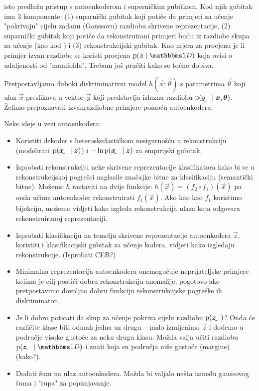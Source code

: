 \documentclass[oneside]{book}
\begin{document}
\citet{Pidhorskyi:2018:GPNDAA} isto predlažu pristup s autoenkoderom i superničkim gubitkom. Kod njih gubitak ima $3$ komponente: (1) suparnički gubitak koji potiče da primjeri za učenje "pokrivaju" cijelu zadanu (Gaussovu) razdiobu skrivene reprezentacije, (2) suparnički gubitak koji potiče da rekonstruirani primjeri budu iz razdiobe skupa za učenje (kao kod \citet{Sabokrou:2018:ALOCCND}) i (3) rekonstrukcijski gubitak. Kao mjera za procjenu je li primjer izvan razdiobe se koristi procjena $\p(\vec z\mid \set D)$ koja ovisi o udaljenosti od "manifolda". Trebam još pručiti kako se točno dobiva.

Pretpostavljamo duboki diskriminativni model $h(\vec x;\vec\theta)$ s parametrima $\vec\theta$ koji ulaz $\vec x$ preslikava u vektor $\vec y$ koji predstavlja izlaznu razdiobu  $\p(\rvar y\mid \vec x, \vec\theta)$. Želimo prepoznavati izvanrazdiobne primjere pomoću autoenkodera.

Neke ideje u vezi autoenkodera:
\begin{itemize}
    \item Koristiti dekoder s heteroskedastičkom \citep{Kendall:2017:WUNBDLCV} nesigurnošću u rekonstrukciju (modelirati $\p(\rvec x\mid \vec z)$) i $-\ln\p(\rvec x\mid \vec z)$ za empirijski gubitak.
    \item Isprobati rekonstrukciju neke skrivene reprezentacije klasifikatora kako bi se u rekonstrukcijskoj pogrešci naglasile značajke bitne za klasifikaciju (semantički bitne). Možemo $h$ rastaviti na dvije funkcije: $h(\vec x) = (f_2\circ f_1)(\vec x)$ pa onda učime autoenkoder rekonstruirati $f_1(\vec x)$. Ako kao kao $f_1$ koristimo bijekciju, možemo vidjeti kako izgleda rekonstrukcija ulaza koja odgovara rekonstruiranoj reprezentaciji.
    \item Isprobati klasifikaciju na temelju skrivene reprezentacije autoenkodera $\vec z$, koristiti i klasifikacijski gubitak za učenje kodera, vidjeti kako izgledaju rekonstrukcije. (Isprobati CEB?)
    \item Minimalna reprezentacija autoenkodera onemogućuje neprijateljske primjere kojima je cilj postići dobru rekonstrukciju anomalije, pogotovo ako pretpostavimo dovoljno dobru funkciju rekonstrukcijske pogreške ili diskriminator.
    \item Je li dobro poticati da skup za učenje pokriva cijelu razdiobu $\p(\rvec z)$? Onda će različite klase biti odmah jedna uz drugu -- malo izmijenimo $\vec z$ i dođemo u područje visoke gustoće za neku drugu klasu. Možda valja učiti razdiobu $\p(\rvec z\mid \set D)$ i znati koja su područja niže gustoće (margine) (kako?).
    \item Dodati šum na ulaz autoenkodera. Možda bi valjalo nešta između gaussovog šuma i "rupa" za popunjavanje.
\end{itemize}
\end{document}
